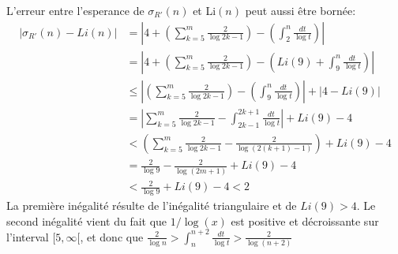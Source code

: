 \documentclass[../main.tex]{report}
\begin{document}
%

L'erreur entre l'esperance de $\sigma_{R'}(n)$ et Li$(n)$ peut aussi être bornée:
\[ \begin{aligned}
\left| \sigma_{R'}(n) - Li(n) \right|
&= \left| 4 + (\sum_{k=5}^m \frac{2}{\log 2k-1})
		- (\int_2^n \frac{dt}{\log t} ) \right| \\
&= \left| 4 + (\sum_{k=5}^m \frac{2}{\log 2k-1})
		- (Li(9) + \int_9^n \frac{dt}{\log t} ) \right| \\
&\leq \left| (\sum_{k=5}^m \frac{2}{\log 2k-1})
		- (\int_9^n \frac{dt}{\log t} ) \right| + \left| 4 - Li(9)\right| \\
&= \left| \sum_{k=5}^m \frac{2}{\log 2k - 1} - 
		\int_{2k-1}^{2k+1} \frac{dt}{\log t} \right| + Li(9) - 4 \\ 
&< (\sum_{k=5}^m \frac{2}{\log 2k-1} - \frac{2}{\log{(2(k+1)-1)}})
		+ Li(9) - 4 \\
&= \frac{2}{\log 9} - \frac{2}{\log (2m + 1)} + Li(9) - 4 \\
&< \frac{2}{\log 9} + Li(9) - 4	< 2		
\end{aligned} \]
La première inégalité résulte de l'inégalité triangulaire et de $Li(9) > 4$. Le second inégalité vient du fait que $1/\log(x)$ est positive et décroissante sur l'interval $[5,\infty[$, 
et donc que $\frac{2}{\log n} > \int_n^{n+2}\frac{dt}{\log t} > \frac{2}{\log (n+2)}$
\end{document}
